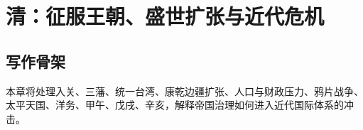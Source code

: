 \chapter{清：征服王朝、盛世扩张与近代危机}
\section{写作骨架}
本章将处理入关、三藩、统一台湾、康乾边疆扩张、人口与财政压力、鸦片战争、太平天国、洋务、甲午、戊戌、辛亥，解释帝国治理如何进入近代国际体系的冲击。

